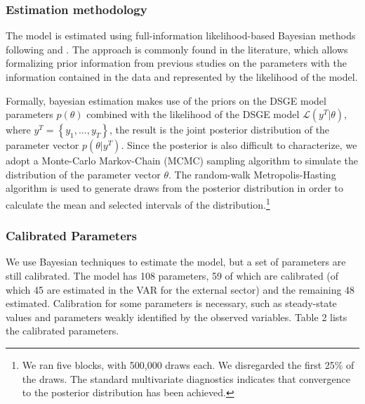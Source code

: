 \documentclass[12pt,oneside,a4paper]{article}
\begin{document}
\subsubsection{Estimation methodology}
The model is estimated using full-information likelihood-based Bayesian methods following \citet{Schorfheide:2007} and \citet{Guerron:2013}. The approach is commonly found in the literature, which allows formalizing  prior information from previous studies on the parameters with the information contained in the data and represented by the likelihood of the model.

Formally, bayesian estimation makes use of the priors on the DSGE model parameters $p(\theta)$ combined with the likelihood of the DSGE model $\mathcal{L}(y^{T}| \theta)$, where $y^{T} = \left\{y_1, ..., y_{T} \right\}$, the result is the joint posterior distribution of the parameter vector $p(\theta|y^{T})$. Since the posterior is also difficult to characterize, we adopt a Monte-Carlo Markov-Chain (MCMC) sampling algorithm to simulate the distribution of the parameter vector $\theta$. The random-walk Metropolis-Hasting algorithm is used to generate draws
from the posterior distribution in order to calculate the mean and selected intervals of the
distribution.\footnote{We ran five blocks, with 500,000 draws each. We disregarded the first 25\% of the draws. The standard multivariate diagnostics indicates that convergence to the posterior distribution has been achieved.}
\subsubsection{Calibrated Parameters}
We use Bayesian techniques to estimate the model, but a set of parameters are still calibrated. The model has 108 parameters, 59 of which are calibrated (of which 45 are estimated in the VAR for the external sector) and the remaining 48 estimated. Calibration for some parameters is necessary, such as steady-state values and parameters weakly identified by the observed variables. Table 2 lists the calibrated parameters.
\end{document}
